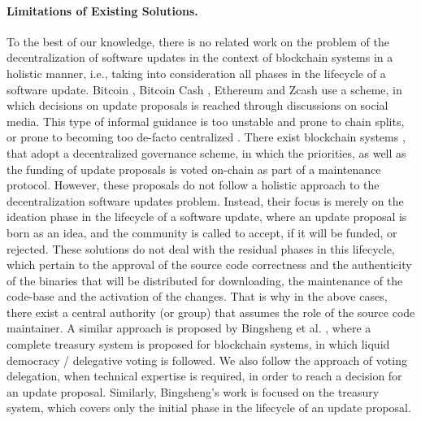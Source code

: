 \paragraph{Limitations of Existing Solutions.}
To the best of our knowledge, there is no related work on the problem of the decentralization of software updates in the context of blockchain systems in a holistic manner, i.e., taking into consideration all phases in the lifecycle of a software update. 
Bitcoin \cite{bitcoin}, Bitcoin Cash , Ethereum \cite{ethereum} and Zcash  use a  scheme, in which decisions on update proposals is reached through discussions on social media. This type of informal guidance is  too unstable and prone to chain splits, or prone to becoming too de-facto centralized \cite{buterin_on_gov}. There exist blockchain systems \cite{dash}, \cite{decred} that adopt a decentralized governance scheme, in which the priorities, as well as the funding of update proposals is voted on-chain as part of a maintenance protocol. However, these proposals do not follow a holistic approach to the decentralization software updates problem. Instead, their focus is merely on the ideation phase in the lifecycle of a software update, where an update proposal is born as an idea, and the community is called to accept, if it will be funded, or rejected. These solutions do not deal with the residual phases in this lifecycle, which pertain to the approval of the source code correctness and the authenticity of the binaries that will be distributed for downloading, the maintenance of the code-base and the activation of the changes. That is why in the above cases, there exist a central authority (or group) that assumes the role of the source code maintainer. A similar approach is proposed by Bingsheng et al. \cite{cryptoeprint:2018:435}, where a complete treasury system is proposed for blockchain systems, in which liquid democracy / delegative voting is followed. We also follow the approach of voting delegation, when technical expertise is required, in order to reach a decision for an update proposal. Similarly, Bingsheng's work is focused on the treasury system, which covers only the initial phase in the lifecycle of an update proposal.


%
